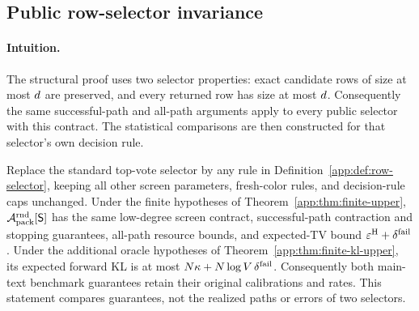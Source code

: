 \subsection{Public row-selector invariance}

\paragraph{Intuition.}
The structural proof uses two selector properties: exact candidate rows
of size at most $d$ are preserved, and every returned row
has size at most $d$.  Consequently the same successful-path and all-path arguments apply
to every public selector with this contract.  The statistical comparisons
are then constructed for that selector's own decision rule.

\begin{proposition}
\label{app:prop:row-selector-invariance}
Replace the standard top-vote selector by any rule in
Definition~\ref{app:def:row-selector}, keeping all other screen parameters,
fresh-color rules, and decision-rule caps unchanged.
Under the finite hypotheses of Theorem~\ref{app:thm:finite-upper},
$\mathcal A_{\mathrm{pack}}^{\mathrm{rnd}}[\mathsf S]$ has the same low-degree screen contract,
successful-path contraction and stopping guarantees, all-path resource
bounds, and expected-TV bound $\varepsilon^{\mathrm H}+\delta^{\mathrm{fail}}$.
Under the additional oracle hypotheses of
Theorem~\ref{app:thm:finite-kl-upper}, its expected forward KL is at most
$N\kappa+N\log V\,\delta^{\mathrm{fail}}$.
Consequently both main-text benchmark guarantees retain their original
calibrations and rates.  This statement compares guarantees, not the
realized paths or errors of two selectors.
\end{proposition}

